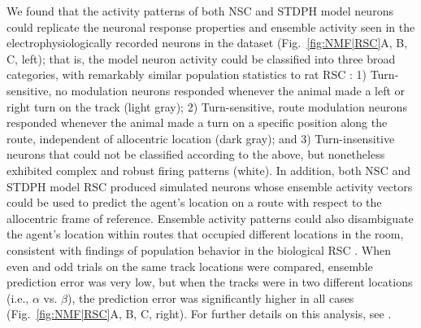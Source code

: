 
We found that the activity patterns of both \ac{NSC} and \ac{STDPH} model neurons could replicate the neuronal response properties and ensemble activity seen in the electrophysiologically recorded neurons in the dataset (Fig.~\ref{fig:NMF|RSC}A, B, C, left); that is, the model neuron activity could be classified into three broad categories,
with remarkably similar population statistics to rat \ac{RSC} 
\citep{AlexanderNitz2015}:
1) Turn-sensitive, no modulation neurons responded whenever the animal made a left or right turn
   on the track (light gray);
2) Turn-sensitive, route modulation neurons responded whenever the animal made a turn on a specific position along
   the route, independent of allocentric location (dark gray); and
3) Turn-insensitive neurons that could not be classified according to the above,
   but nonetheless exhibited complex and robust firing patterns (white). In addition, both \ac{NSC} and \ac{STDPH} model \ac{RSC} produced simulated neurons whose ensemble activity vectors could be used to predict the agent's location on a route with respect to the allocentric frame of reference. Ensemble activity patterns could also disambiguate the agent's location within routes that occupied different locations in the room, consistent with findings of population behavior in the biological RSC \citep{AlexanderNitz2015}.
When even and odd trials on the same track locations were compared,
ensemble prediction error was very low,
but when the tracks were in two different locations
(i.e., $\alpha$ vs. $\beta$),
the prediction error was significantly higher in all cases
(Fig.~\ref{fig:NMF|RSC}A, B, C, right).
For further details on this analysis, see \citep{AlexanderNitz2015,Rounds2016}.
   
